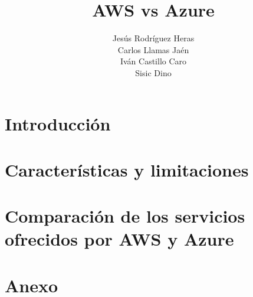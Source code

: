 \documentclass{book}
\title{\huge{AWS vs Azure}}
\author{Jesús Rodríguez Heras\\
	Carlos Llamas Jaén\\
	Iván Castillo Caro\\
	Sisic Dino}
\begin{document}
	\maketitle
	
	\newpage
	
	\tableofcontents
	\newpage
	
	\part{Introducción}
	
	
	
	\part{Características y limitaciones}
	
	
	
	\part{Comparación de los servicios ofrecidos por AWS y Azure}
	
	
	
	
	\part{Anexo}
	
	
\end{document}
